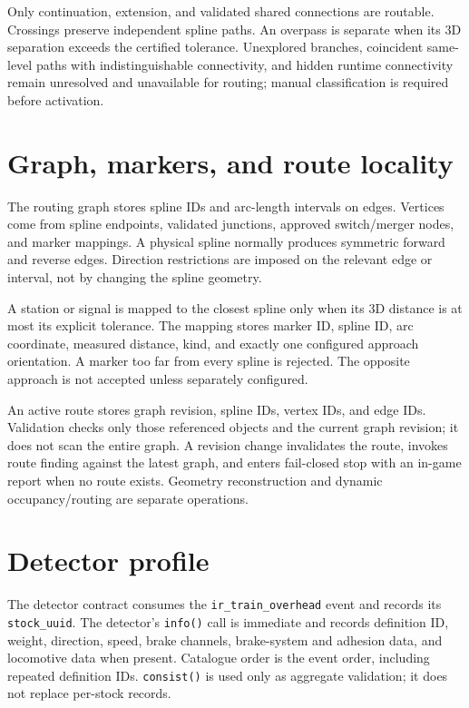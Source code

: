 \documentclass[10pt,a4paper]{article}
\begin{document}
Only continuation, extension, and validated shared connections are routable.
Crossings preserve independent spline paths.  An overpass is separate when its
3D separation exceeds the certified tolerance.  Unexplored branches,
coincident same-level paths with indistinguishable connectivity, and hidden
runtime connectivity remain unresolved and unavailable for routing; manual
classification is required before activation.

\section{Graph, markers, and route locality}

The routing graph stores spline IDs and arc-length intervals on edges.  Vertices
come from spline endpoints, validated junctions, approved switch/merger nodes,
and marker mappings.  A physical spline normally produces symmetric forward
and reverse edges.  Direction restrictions are imposed on the relevant edge or
interval, not by changing the spline geometry.

A station or signal is mapped to the closest spline only when its 3D distance
is at most its explicit tolerance.  The mapping stores marker ID, spline ID,
arc coordinate, measured distance, kind, and exactly one configured approach
orientation.  A marker too far from every spline is rejected.  The opposite
approach is not accepted unless separately configured.

An active route stores graph revision, spline IDs, vertex IDs, and edge IDs.
Validation checks only those referenced objects and the current graph revision;
it does not scan the entire graph.  A revision change invalidates the route,
invokes route finding against the latest graph, and enters fail-closed stop with
an in-game report when no route exists.  Geometry reconstruction and dynamic
occupancy/routing are separate operations.

\section{Detector profile}

The detector contract consumes the \texttt{ir\_train\_overhead} event and
records its \texttt{stock\_uuid}.  The detector's \texttt{info()} call is
immediate and records definition ID, weight, direction, speed, brake channels,
brake-system and adhesion data, and locomotive data when present.  Catalogue
order is the event order, including repeated definition IDs.  \texttt{consist()}
is used only as aggregate validation; it does not replace per-stock records.
\end{document}
